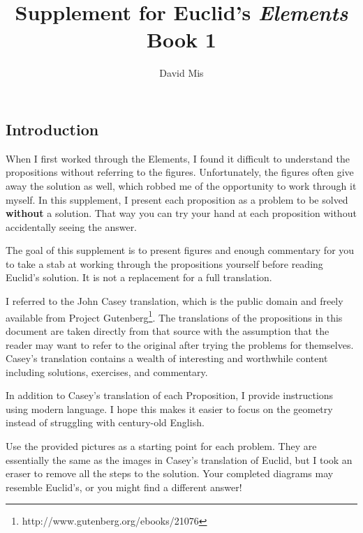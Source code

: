 \documentclass[openany]{book}
\title{Supplement for Euclid's \textit{Elements} Book 1}
\author{David Mis}
\begin{document}
    \maketitle

    \renewcommand{\chaptermark}[1]{\markboth{#1}{}}
    \renewcommand{\sectionmark}[1]{}

    \chapter*{}
    \section*{Introduction}

    When I first worked through the Elements, I found it difficult to understand the propositions without referring to the figures. Unfortunately, the figures often give away the solution as well, which robbed me of the opportunity to work through it myself. In this supplement, I present each proposition as a problem to be solved \textbf{without} a solution. That way you can try your hand at each proposition without accidentally seeing the answer.

    The goal of this supplement is to present figures and enough commentary for you to take a stab at working through the propositions yourself before reading Euclid's solution. It is not a replacement for a full translation.

    I referred to the John Casey translation, which is the public domain and freely available from Project Gutenberg\footnote{http://www.gutenberg.org/ebooks/21076}. The translations of the propositions in this document are taken directly from that source with the assumption that the reader may want to refer to the original after trying the problems for themselves. Casey's translation contains a wealth of interesting and worthwhile content including solutions, exercises, and commentary.

    In addition to Casey's translation of each Proposition, I provide instructions using modern language. I hope this makes it easier to focus on the geometry instead of struggling with century-old English.

    Use the provided pictures as a starting point for each problem. They are essentially the same as the images in Casey's translation of Euclid, but I took an eraser to remove all the steps to the solution. Your completed diagrams may resemble Euclid's, or you might find a different answer!
\end{document}
